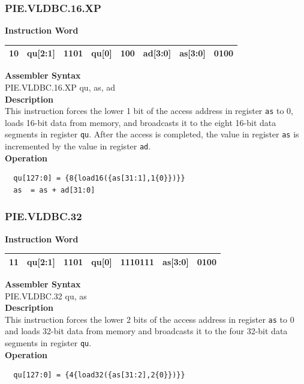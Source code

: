 \newpage
\subsubsection{PIE.VLDBC.16.XP}\label{instruction:PIEVLDBC16XP}
\setlength\tabcolsep{6pt}
\textbf{Instruction Word} \\
\begin{tabular}{|c|c|c|c|c|c|c|c|}
	\hline
	10 & qu[2:1] & 1101 & qu[0] & 100 & ad[3:0] & as[3:0] & 0100 \\
	\hline
\end{tabular}

\textbf{Assembler Syntax} \\
PIE.VLDBC.16.XP qu, as, ad \\
\textbf{Description} \\
This instruction forces the lower 1 bit of the access address in register \lstinline{as} to 0, loads 16-bit data from memory, and broadcasts it to the eight 16-bit data segments in register \lstinline{qu}. After the access is completed, the value in register \lstinline{as} is incremented by the value in register \lstinline{ad}.\\
\textbf{Operation}
\begin{lstlisting}
  qu[127:0] = {8{load16({as[31:1],1{0}})}}
  as  = as + ad[31:0]
\end{lstlisting}

\newpage
\subsubsection{PIE.VLDBC.32}\label{instruction:PIEVLDBC32}
\setlength\tabcolsep{6pt}
\textbf{Instruction Word} \\
\begin{tabular}{|c|c|c|c|c|c|c|}
	\hline
	11 & qu[2:1] & 1101 & qu[0] & 1110111 & as[3:0] & 0100 \\
	\hline
\end{tabular}

\textbf{Assembler Syntax} \\
PIE.VLDBC.32 qu, as \\
\textbf{Description} \\
This instruction forces the lower 2 bits of the access address in register \lstinline{as} to 0 and loads 32-bit data from memory and broadcasts it to the four 32-bit data segments in register \lstinline{qu}.\\
\textbf{Operation}
\begin{lstlisting}
  qu[127:0] = {4{load32({as[31:2],2{0}})}}
\end{lstlisting}

